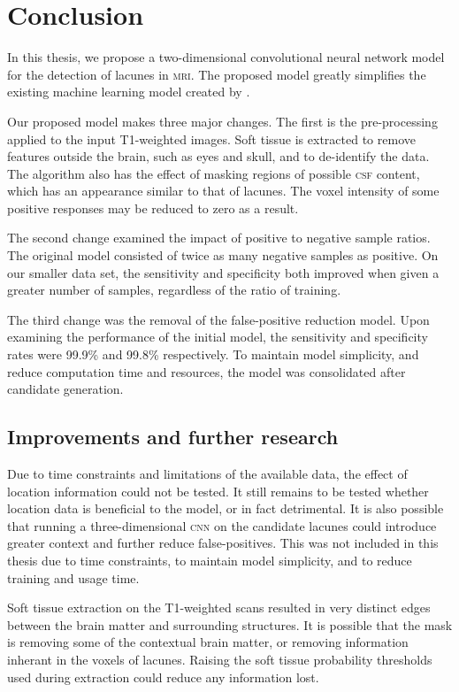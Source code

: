 %
%

\chapter{Conclusion}\label{conclusion}

In this thesis, we propose a two-dimensional convolutional neural network model for the detection of lacunes in \textsc{mri}. The proposed model greatly simplifies the existing machine learning model created by \cite{GhafoorianM.2017Dml3}.

Our proposed model makes three major changes. The first is the pre-processing applied to the input T1-weighted images. Soft tissue is extracted to remove features outside the brain, such as eyes and skull, and to de-identify the data. The algorithm also has the effect of masking regions of possible \textsc{csf} content, which has an appearance similar to that of lacunes. The voxel intensity of some positive responses may be reduced to zero as a result.

The second change examined the impact of positive to negative sample ratios. The original model consisted of twice as many negative samples as positive. On our smaller data set, the sensitivity and specificity both improved when given a greater number of samples, regardless of the ratio of training.

The third change was the removal of the false-positive reduction model. Upon examining the performance of the initial model, the sensitivity and specificity rates were 99.9\% and 99.8\% respectively. To maintain model simplicity, and reduce computation time and resources, the model was consolidated after candidate generation.

\section{Improvements and further research}

Due to time constraints and limitations of the available data, the effect of location information could not be tested. It still remains to be tested whether location data is beneficial to the model, or in fact detrimental. It is also possible that running a three-dimensional \textsc{cnn} on the candidate lacunes could introduce greater context and further reduce false-positives. This was not included in this thesis due to time constraints, to maintain model simplicity, and to reduce training and usage time.

Soft tissue extraction on the T1-weighted scans resulted in very distinct edges between the brain matter and surrounding structures. It is possible that the mask is removing some of the contextual brain matter, or removing information inherant in the voxels of lacunes. Raising the soft tissue probability thresholds used during extraction could reduce any information lost.

